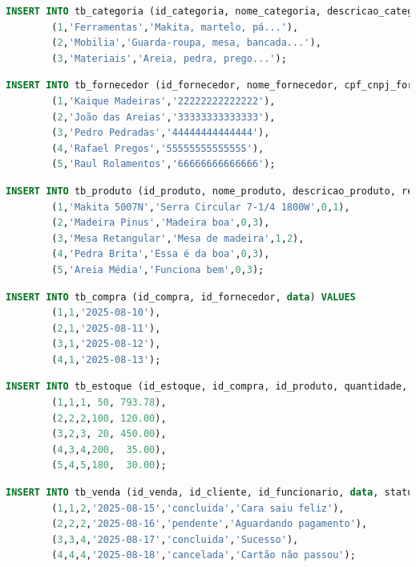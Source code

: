 \documentclass[
12pt,
a4paper,
semrecuonosumario,
sumario = abnt-6027-2012]{report}
\begin{document}
    \begin{lstlisting}[language=SQL,caption={DML -- Tabela \texttt{tb\_categoria}}]
		INSERT INTO tb_categoria (id_categoria, nome_categoria, descricao_categoria) VALUES
		(1,'Ferramentas','Makita, martelo, pá...'),
		(2,'Mobilia','Guarda-roupa, mesa, bancada...'),
		(3,'Materiais','Areia, pedra, prego...');
    \end{lstlisting}
    
    \begin{lstlisting}[language=SQL,caption={DML -- Tabela \texttt{tb\_fornecedor}}]
		INSERT INTO tb_fornecedor (id_fornecedor, nome_fornecedor, cpf_cnpj_fornecedor) VALUES
		(1,'Kaique Madeiras','22222222222222'),
		(2,'João das Areias','33333333333333'),
		(3,'Pedro Pedradas','44444444444444'),
		(4,'Rafael Pregos','55555555555555'),
		(5,'Raul Rolamentos','66666666666666');
    \end{lstlisting}
    
    \begin{lstlisting}[language=SQL,caption={DML -- Tabela \texttt{tb\_produto}}]
		INSERT INTO tb_produto (id_produto, nome_produto, descricao_produto, requer_montagem, id_categoria) VALUES
		(1,'Makita 5007N','Serra Circular 7-1/4 1800W',0,1),
		(2,'Madeira Pinus','Madeira boa',0,3),
		(3,'Mesa Retangular','Mesa de madeira',1,2),
		(4,'Pedra Brita','Essa é da boa',0,3),
		(5,'Areia Média','Funciona bem',0,3);
    \end{lstlisting}
    
    \begin{lstlisting}[language=SQL,caption={DML -- Tabela \texttt{tb\_compra}}]
		INSERT INTO tb_compra (id_compra, id_fornecedor, data) VALUES
		(1,1,'2025-08-10'),
		(2,1,'2025-08-11'),
		(3,1,'2025-08-12'),
		(4,1,'2025-08-13');
    \end{lstlisting}
    
    \begin{lstlisting}[language=SQL,caption={DML -- Tabela \texttt{tb\_estoque}}]
		INSERT INTO tb_estoque (id_estoque, id_compra, id_produto, quantidade, preco_estoque) VALUES
		(1,1,1, 50, 793.78),
		(2,2,2,100, 120.00),
		(3,2,3, 20, 450.00),
		(4,3,4,200,  35.00),
		(5,4,5,180,  30.00);
    \end{lstlisting}
    
    \begin{lstlisting}[language=SQL,caption={DML -- Tabela \texttt{tb\_venda}}]
		INSERT INTO tb_venda (id_venda, id_cliente, id_funcionario, data, status, observacao_venda) VALUES
		(1,1,2,'2025-08-15','concluida','Cara saiu feliz'),
		(2,2,2,'2025-08-16','pendente','Aguardando pagamento'),
		(3,3,4,'2025-08-17','concluida','Sucesso'),
		(4,4,4,'2025-08-18','cancelada','Cartão não passou');
    \end{lstlisting}
    
\end{document}

